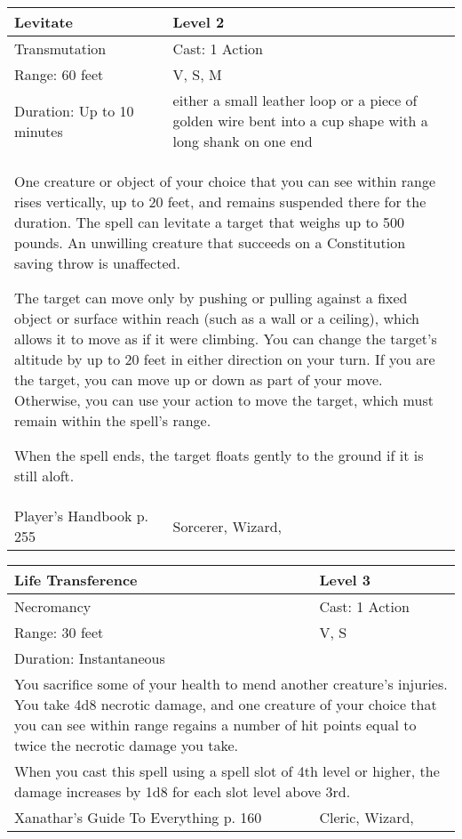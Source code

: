 \documentclass[11pt]{report}
\begin{document}
\begin{table}[H]
	\begin{tabular}{||p{6cm}|p{6cm}||}
		\hline\hline
		\bf{Levitate} & Level 2\\ \hline
		Transmutation & Cast: 1 Action\\ \hline
		Range: 60 feet & V, S, M\\ \hline
		Duration: Up to 10 minutes & either a small leather loop or a piece of golden wire bent into a cup shape with a long shank on one end\\ \hline
		\multicolumn{2}{||p{12cm}||}{One creature or object of your choice that you can see within range rises vertically, up to 20 feet, and remains suspended there for the duration. The spell can levitate a target that weighs up to 500 pounds. An unwilling creature that succeeds on a Constitution saving throw is unaffected.

The target can move only by pushing or pulling against a fixed object or surface within reach (such as a wall or a ceiling), which allows it to move as if it were climbing. You can change the target’s altitude by up to 20 feet in either direction on your turn. If you are the target, you can move up or down as part of your move. Otherwise, you can use your action to move the target, which must remain within the spell’s range.

When the spell ends, the target floats gently to the ground if it is still aloft.}\\ \hline
Player's Handbook p. 255 & Sorcerer, Wizard, \\ \hline\hline
	\end{tabular}
\end{table}

\begin{table}[H]
	\begin{tabular}{||p{6cm}|p{6cm}||}
		\hline\hline
		\bf{Life Transference} & Level 3\\ \hline
		Necromancy & Cast: 1 Action\\ \hline
		Range: 30 feet & V, S\\ \hline
		Duration: Instantaneous & \\ \hline
		\multicolumn{2}{||p{12cm}||}{You sacrifice some of your health to mend another creature’s injuries. You take 4d8 necrotic damage, and one creature of your choice that you can see within range regains a number of hit points equal to twice the necrotic damage you take.}\\ \hline
		\multicolumn{2}{||p{12cm}||}{When you cast this spell using a spell slot of 4th level or higher, the damage increases by 1d8 for each slot level above 3rd.}\\ \hline
Xanathar's Guide To Everything p. 160 & Cleric, Wizard, \\ \hline\hline
	\end{tabular}
\end{table}
\end{document}
